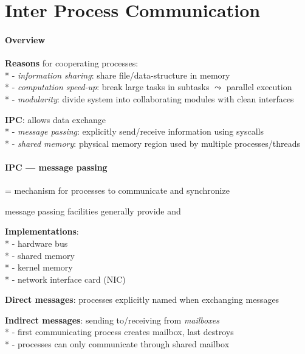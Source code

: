 \section{Inter Process Communication}

\paragraph{Overview}
\begin{items}
  \item \textbf{Reasons} for cooperating processes: \\*
    - \emph{information sharing}: share file/data-structure in memory \\*
    - \emph{computation speed-up}: break large tasks in subtasks \( \leadsto \) parallel execution \\*
    - \emph{modularity}: divide system into collaborating modules with clean interfaces
  \item \textbf{IPC}: allows data exchange \\*
    - \emph{message passing}: explicitly send/receive information using syscalls \\*
    - \emph{shared memory}: physical memory region used by multiple processes/threads
\end{items}

\paragraph{IPC --- message passing}
\begin{items}
  \item = mechanism for processes to communicate and synchronize
  \item message passing facilities generally provide  and 
  \item \textbf{Implementations}: \\*
    - hardware bus \\*
    - shared memory \\*
    - kernel memory \\*
    - network interface card (NIC)
  \item \textbf{Direct messages}: processes explicitly named when exchanging messages
  \item \textbf{Indirect messages}: sending to/receiving from \emph{mailboxes} \\*
    - first communicating process creates mailbox, last destroys \\*
    - processes can only communicate through shared mailbox
\end{items}

